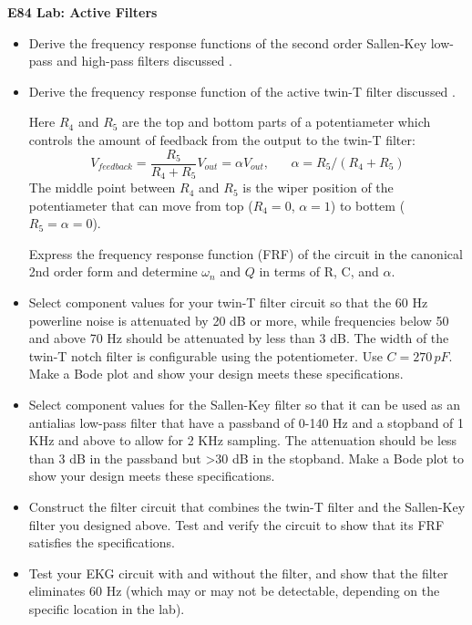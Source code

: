 \usepackage{html}


{\Large \bf E84 Lab: Active Filters}


\begin{itemize}

\item Derive the frequency response functions of the second 
  order Sallen-Key low-pass and high-pass filters discussed 
  .

\item Derive the frequency response function of the active twin-T 
  filter discussed .

  Here $R_4$ and $R_5$ are the top and bottom parts of a potentiameter
  which controls the amount of feedback from the output to the 
  twin-T filter:
  \[
  V_{feedback}=\frac{R_5}{R_4+R_5}V_{out}=\alpha V_{out},\;\;\;\;\;\;  \alpha=R_5/(R_4+R_5)
  \]
  The middle point between $R_4$ and $R_5$ is the wiper position of 
  the potentiameter that can move from top ($R_4=0$, $\alpha=1$) to 
  bottem ($R_5=\alpha=0$).

  Express the frequency response function (FRF) of the circuit in the 
  canonical 2nd order form and determine $\omega_n$ and $Q$ in terms 
  of R, C, and $\alpha$. 

\item Select component values for your twin-T filter circuit so that 
  the 60 Hz powerline noise is attenuated by 20 dB or more, while 
  frequencies below 50 and above 70 Hz should be attenuated by less 
  than 3 dB. The width of the twin-T notch filter is configurable using 
  the potentiometer. Use $C=270\,pF$. Make a Bode plot and show your 
  design meets these specifications.

\item Select component values for the Sallen-Key filter so that it 
  can be used as an antialias low-pass filter that have a passband 
  of 0-140 Hz and a stopband of 1 KHz and above to allow for 2 KHz 
  sampling. The attenuation should be less than 3 dB in the passband 
  but >30 dB in the stopband. Make a Bode plot to show your design 
  meets these specifications.

\item Construct the filter circuit that combines the twin-T filter 
  and the Sallen-Key filter you designed above. Test and verify the
  circuit to show that its FRF satisfies the specifications.


\item Test your EKG circuit with and without the filter, and show that 
  the filter eliminates 60 Hz (which may or may not be detectable, 
  depending on the specific location in the lab).


\end{itemize}


